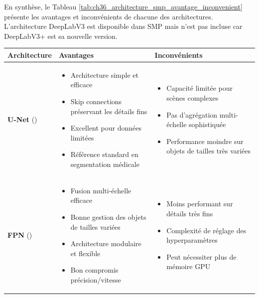 En synthèse, le Tableau \ref{tab:ch36_architecture_smp_avantage_inconvenient} présente les avantages et inconvénients de chacune des architectures. L'architecture DeepLabV3 est disponible dans SMP mais n'est pas incluse car DeepLabV3+ est sa nouvelle version.

\begin{longtable}{|p{2.2cm}|p{6cm}|p{6cm}|}
\hline
\textbf{Architecture} & \textbf{Avantages} & \textbf{Inconvénients} \\
\hline
\endhead

\textbf{U-Net} (\citeyear{ronneberger_u-net_2015}) \cite{ronneberger_u-net_2015} & 
\begin{itemize}[leftmargin=0.4cm]
    \item Architecture simple et efficace
    \item Skip connections préservant les détails fins
    \item Excellent pour données limitées
    \item Référence standard en segmentation médicale
\end{itemize} & 
\begin{itemize}[leftmargin=0.4cm]
    \item Capacité limitée pour scènes complexes
    \item Pas d'agrégation multi-échelle sophistiquée
    \item Performance moindre sur objets de tailles très variées
\end{itemize} \\
\hline

\textbf{FPN} (\citeyear{lin_feature_2017}) \cite{lin_feature_2017} &
\begin{itemize}[leftmargin=0.4cm]
    \item Fusion multi-échelle efficace
    \item Bonne gestion des objets de tailles variées
    \item Architecture modulaire et flexible
    \item Bon compromis précision/vitesse
\end{itemize} & 
\begin{itemize}[leftmargin=0.4cm]
    \item Moins performant sur détails très fins
    \item Complexité de réglage des hyperparamètres
    \item Peut nécessiter plus de mémoire GPU
\end{itemize} \\
\hline


\end{longtable}
